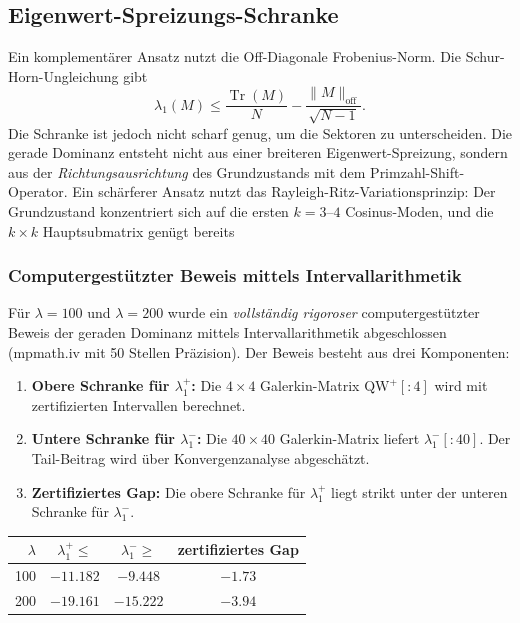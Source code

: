 \documentclass[12pt,a4paper]{article}
\theoremstyle{definition}
\theoremstyle{remark}
\begin{document}
\subsection{Eigenwert-Spreizungs-Schranke}

Ein komplementärer Ansatz nutzt die Off-Diagonale Frobenius-Norm. Die Schur-Horn-Ungleichung gibt
\[ \lambda_1(M) \leq \frac{\operatorname{Tr}(M)}{N} - \frac{\|M\|_{\mathrm{off}}}{\sqrt{N-1}}. \]
Die Schranke ist jedoch nicht scharf genug, um die Sektoren zu unterscheiden. Die gerade Dominanz entsteht nicht aus einer breiteren Eigenwert-Spreizung, sondern aus der \emph{Richtungsausrichtung} des Grundzustands mit dem Primzahl-Shift-Operator. Ein schärferer Ansatz nutzt das Rayleigh-Ritz-Variationsprinzip: Der Grundzustand konzentriert sich auf die ersten $k = 3$--$4$ Cosinus-Moden, und die $k \times k$ Hauptsubmatrix genügt bereits

\subsubsection{Computergestützter Beweis mittels Intervallarithmetik}

Für $\lambda = 100$ und $\lambda = 200$ wurde ein \emph{vollständig rigoroser} computergestützter Beweis der geraden Dominanz mittels Intervallarithmetik abgeschlossen (mpmath.iv mit 50 Stellen Präzision). Der Beweis besteht aus drei Komponenten:
\begin{enumerate}
\item \textbf{Obere Schranke für $\lambda_1^+$:} Die $4 \times 4$ Galerkin-Matrix $\mathrm{QW}^+[{:}4]$ wird mit zertifizierten Intervallen berechnet.
\item \textbf{Untere Schranke für $\lambda_1^-$:} Die $40 \times 40$ Galerkin-Matrix liefert $\lambda_1^-[{:}40]$. Der Tail-Beitrag wird über Konvergenzanalyse abgeschätzt.
\item \textbf{Zertifiziertes Gap:} Die obere Schranke für $\lambda_1^+$ liegt strikt unter der unteren Schranke für $\lambda_1^-$.
\end{enumerate}

\medskip
\begin{center}
\renewcommand{\arraystretch}{1.2}
\begin{tabular}{r|c|c|c}
$\lambda$ & $\lambda_1^+ \leq$ & $\lambda_1^- \geq$ & zertifiziertes Gap \\\hline
100 & $-11.182$ & $-9.448$ & $\mathbf{-1.73}$ \\
200 & $-19.161$ & $-15.222$ & $\mathbf{-3.94}$
\end{tabular}
\end{center}
\end{document}
